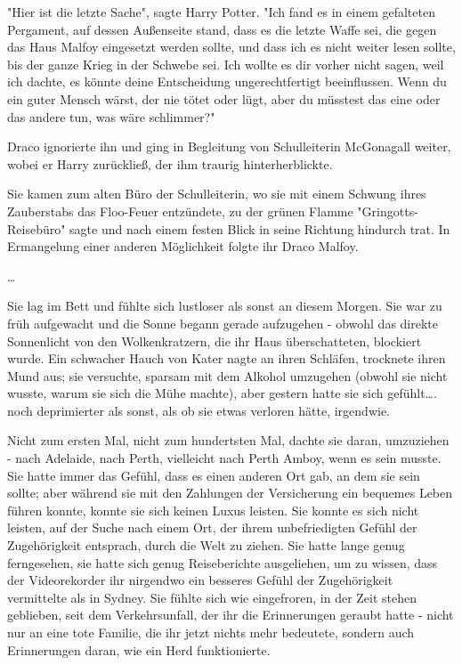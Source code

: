 {"Hier ist die letzte Sache", sagte Harry Potter. "Ich fand es in einem gefalteten Pergament, auf dessen Außenseite stand, dass es die letzte Waffe sei, die gegen das Haus Malfoy eingesetzt werden sollte, und dass ich es nicht weiter lesen sollte, bis der ganze Krieg in der Schwebe sei. Ich wollte es dir vorher nicht sagen, weil ich dachte, es könnte deine Entscheidung ungerechtfertigt beeinflussen. Wenn du ein guter Mensch wärst, der nie tötet oder lügt, aber du müsstest das eine oder das andere tun, was wäre schlimmer?"

Draco ignorierte ihn und ging in Begleitung von Schulleiterin McGonagall weiter, wobei er Harry zurückließ, der ihm traurig hinterherblickte.

Sie kamen zum alten Büro der Schulleiterin, wo sie mit einem Schwung ihres Zauberstabs das Floo-Feuer entzündete, zu der grünen Flamme "Gringotts-Reisebüro" sagte und nach einem festen Blick in seine Richtung hindurch trat. In Ermangelung einer anderen Möglichkeit folgte ihr Draco Malfoy.

…

Sie lag im Bett und fühlte sich lustloser als sonst an diesem Morgen. Sie war zu früh aufgewacht und die Sonne begann gerade aufzugehen - obwohl das direkte Sonnenlicht von den Wolkenkratzern, die ihr Haus überschatteten, blockiert wurde. Ein schwacher Hauch von Kater nagte an ihren Schläfen, trocknete ihren Mund aus; sie versuchte, sparsam mit dem Alkohol umzugehen (obwohl sie nicht wusste, warum sie sich die Mühe machte), aber gestern hatte sie sich gefühlt…. noch deprimierter als sonst, als ob sie etwas verloren hätte, irgendwie.

Nicht zum ersten Mal, nicht zum hundertsten Mal, dachte sie daran, umzuziehen - nach Adelaide, nach Perth, vielleicht nach Perth Amboy, wenn es sein musste. Sie hatte immer das Gefühl, dass es einen anderen Ort gab, an dem sie sein sollte; aber während sie mit den Zahlungen der Versicherung ein bequemes Leben führen konnte, konnte sie sich keinen Luxus leisten. Sie konnte es sich nicht leisten, auf der Suche nach einem Ort, der ihrem unbefriedigten Gefühl der Zugehörigkeit entsprach, durch die Welt zu ziehen. Sie hatte lange genug ferngesehen, sie hatte sich genug Reiseberichte ausgeliehen, um zu wissen, dass der Videorekorder ihr nirgendwo ein besseres Gefühl der Zugehörigkeit vermittelte als in Sydney. Sie fühlte sich wie eingefroren, in der Zeit stehen geblieben, seit dem Verkehrsunfall, der ihr die Erinnerungen geraubt hatte - nicht nur an eine tote Familie, die ihr jetzt nichts mehr bedeutete, sondern auch Erinnerungen daran, wie ein Herd funktionierte.

}
